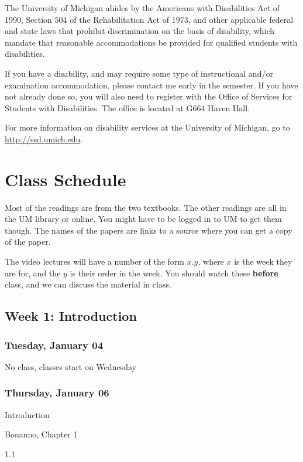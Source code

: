 \documentclass[
]{article}
\providecommand{\tightlist}{%
  \setlength{\itemsep}{0pt}\setlength{\parskip}{0pt}}
\begin{document}
The University of Michigan abides by the Americans with Disabilities Act
of 1990, Section 504 of the Rehabilitation Act of 1973, and other
applicable federal and state laws that prohibit discrimination on the
basis of disability, which mandate that reasonable accommodations be
provided for qualified students with disabilities.

If you have a disability, and may require some type of instructional
and/or examination accommodation, please contact me early in the
semester. If you have not already done so, you will also need to
register with the Office of Services for Students with Disabilities. The
office is located at G664 Haven Hall.

For more information on disability services at the University of
Michigan, go to \url{http://ssd.umich.edu}.

\newpage

\hypertarget{class-schedule}{%
\section{Class Schedule}\label{class-schedule}}

Most of the readings are from the two textbooks. The other readings are
all in the UM library or online. You might have to be logged in to UM to
get them though. The names of the papers are links to a source where you
can get a copy of the paper.

The video lectures will have a number of the form \(x.y\), where \(x\)
is the week they are for, and the \(y\) is their order in the week. You
should watch these \textbf{before} class, and we can discuss the
material in class.

\hypertarget{week-1-introduction}{%
\subsection{Week 1: Introduction}\label{week-1-introduction}}

\begin{multicols}{2}

\hypertarget{tuesday-january-04}{%
\subsubsection{Tuesday, January 04}\label{tuesday-january-04}}

No class, classes start on Wednesday

\columnbreak

\hypertarget{thursday-january-06}{%
\subsubsection{Thursday, January 06}\label{thursday-january-06}}

\begin{description}
\tightlist
\item[Topic]
Introduction
\item[Reading]
Bonanno, Chapter 1
\item[Video lectures]
1.1
\end{description}

\end{multicols}
\end{document}
